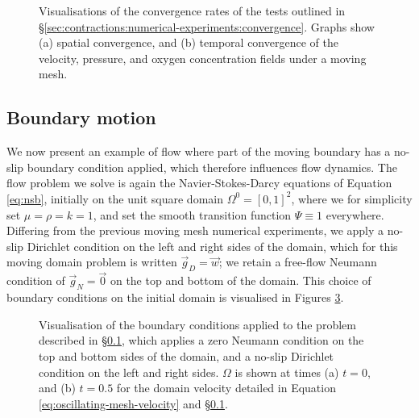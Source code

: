 \begin{figure}
\begin{subfigure}{0.45\textwidth}
                    \caption{}
                    \label{fig:mms-mm-convergence:time}
                \end{subfigure}
                \caption{Visualisations of the convergence rates of the tests outlined in \S\ref{sec:contractions:numerical-experiments:convergence}. Graphs show (a) spatial convergence, and (b) temporal convergence of the velocity, pressure, and oxygen concentration fields under a moving mesh.}
                \label{fig:mms-mm-convergence}
            \end{figure}

        \subsection{Boundary motion} \label{sec:contractions:numerical-experiments:boundary-movement}
            We now present an example of flow where part of the moving boundary has a no-slip boundary condition applied, which therefore influences flow dynamics. The flow problem we solve is again the Navier-Stokes-Darcy equations of Equation \eqref{eq:nsb}, initially on the unit square domain $\Omega^0 = [0, 1]^2$, where we for simplicity set $\mu = \rho = k = 1$, and set the smooth transition function $\Psi \equiv 1$ everywhere. Differing from the previous moving mesh numerical experiments, we apply a no-slip Dirichlet condition on the left and right sides of the domain, which for this moving domain problem is written $\vec{g}_D = \vec{w}$; we retain a free-flow Neumann condition of $\vec{g}_N = \vec{0}$ on the top and bottom of the domain. This choice of boundary conditions on the initial domain is visualised in Figures \ref{fig:square-solid-wall:0}.

            \begin{figure}
                \centering
                \begin{subfigure}{0.4\textwidth}
                    \centering
                    
                    \caption{}
                    \label{fig:square-solid-wall:0}
                \end{subfigure}
                \hfill
                \begin{subfigure}{0.53\textwidth}
                    \centering
                    
                    \caption{}
                    \label{fig:square-solid-wall:later}
                \end{subfigure}
                \caption{Visualisation of the boundary conditions applied to the problem described in \S\ref{sec:contractions:numerical-experiments:boundary-movement}, which applies a zero Neumann condition on the top and bottom sides of the domain, and a no-slip Dirichlet condition on the left and right sides. $\Omega$ is shown at times (a) $t=0$, and (b) $t=0.5$ for the domain velocity detailed in Equation \eqref{eq:oscillating-mesh-velocity} and \S\ref{sec:contractions:numerical-experiments:boundary-movement}.}
                \label{fig:square-solid-wall}
            \end{figure}
            
